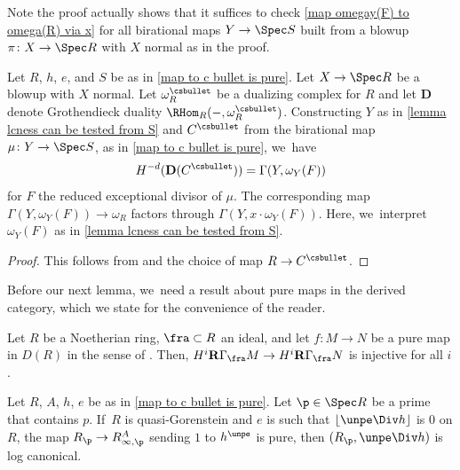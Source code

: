 \begin{remark}\label{rk weaker assumptions for lcness from S}
Note the proof actually shows that it suffices to check \autoref{map omegay(F) to omega(R) via x} for all birational maps $Y\to \Spec S$ built from a blowup $\pi\colon X\to \Spec R$ with $X$ normal as in the proof.
\end{remark}

\begin{lemma}\label{bottom coh of C bullet}
Let $R$, $h$, $e$, and $S$ be as in \autoref{map to c bullet is pure}.
Let $X\to \Spec R$ be a blowup with $X$ normal. Let $\omega_R^\csbullet$ be a dualizing complex for $R$ and let $\mathbf{D}$ denote Grothendieck duality $\RHom_R(-,\omega_R^\csbullet)$.
Constructing $Y$ as in \autoref{lemma lcness can be tested from S} and $C^\csbullet$ from the birational map $\mu\colon Y\to \Spec S$, as in \autoref{map to c bullet is pure}, we~have
\[H^{-d}(\mathbf{D}(C^\csbullet))=\Gamma(Y,\omega_Y(F))\] for $F$ the reduced exceptional divisor of $\mu$.
The corresponding map $\Gamma(Y,\omega_Y(F) )\to \omega_R$ factors through $\Gamma(Y,x\cdot \omega_Y(F))$. Here, we~interpret $\omega_Y(F)$ as in \autoref{lemma lcness can be tested from S}.
\end{lemma}

\begin{proof}
This follows from \cite[Claim\,5.5]{BMPSTWWPerfectoidPure} and the choice of map $R\to C^\csbullet$.
\end{proof}

Before our next lemma, we~need a result about pure maps in the derived category, which we state for the convenience of the reader.

\begin{lemma}\label{pure implies inj on coh}
Let $R$ be a Noetherian ring, $\fra\subset R$ an ideal, and let $f\colon M\to N$ be a pure map in $D(R)$ in the sense of \cite[\S 2.1]{BMPSTWWPerfectoidPure}. Then, $H^i \mathbf{R}\Gamma_\fra M\to H^i \mathbf{R}\Gamma_\fra N$ is injective for all $i$.
\end{lemma}

\begin{proposition}\label{lc implies log canonical p in p}
Let $R$, $A$, $h$, $e$ be as in \autoref{map to c bullet is pure}. Let $\p\in \Spec R$ be a prime that contains $p$. If~$R$ is quasi-Gorenstein and $e$ is such that $\lfloor \unpe\Div h \rfloor$ is $0$ on $R$, the map $R_\p\to R^A_{\infty,\p}$ sending $1$ to $h^\unpe$ is pure, then $(R_\p,\unpe \Div h)$ is log canonical.
\end{proposition}

